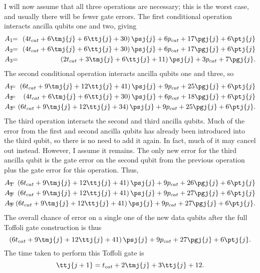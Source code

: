 I will now assume that all three operations are necessary; this is the
worst case, and usually there will be fewer gate errors.  The first
conditional operation interacts ancilla qubits one and two, giving
\begin{eqnarray}
	A_1 & \!\! = & \!\! \left(4 t_{cat} + 6 \tmj{j} + 6 \ttj{j} + 30 \right) \psj{j}
	+ 6 p_{cat} + 17 \pgj{j} + 6 \ptj{j} \\
	A_2 & \!\! = & \!\! \left(4 t_{cat} + 6 \tmj{j} + 6 \ttj{j} + 30 \right) \psj{j}
	+ 6 p_{cat} + 17 \pgj{j} + 6 \ptj{j} \\
	A_3 & \!\! = & \!\! \left(2 t_{cat} + 3 \tmj{j} + 6 \ttj{j} + 11 \right) \psj{j}
	+ 3 p_{cat} + 7 \pgj{j}.
\end{eqnarray}
The second conditional operation interacts ancilla qubits one and three, so
\begin{eqnarray}
	A_1 & \!\!\!\! = & \!\!\!\! \left(6 t_{cat} + 9 \tmj{j} + 12 \ttj{j} + 41
	\right) \psj{j} + 9 p_{cat} + 25 \pgj{j} + 6 \ptj{j} \\
	A_2 & \!\!\!\! = & \!\!\!\! \left(4 t_{cat} + 6 \tmj{j} + 6 \ttj{j} + 30
	\right) \psj{j} + 6 p_{cat} + 18 \pgj{j} + 6 \ptj{j} \\
	A_3 & \!\!\!\! = & \!\!\!\! \left(6 t_{cat} + 9 \tmj{j} + 12 \ttj{j} + 34
	\right) \psj{j} + 9 p_{cat} + 25 \pgj{j} + 6 \ptj{j}.
\end{eqnarray}
The third operation interacts the second and third ancilla qubits.  Much of
the error from the first and second ancilla qubits has already been
introduced into the third qubit, so there is no need to add it again.  In fact,
much of it may cancel out instead.  However, I assume it remains.  The
only new error for the third ancilla qubit is the gate error on the second
qubit from the previous operation plus the gate error for this operation.
Thus,
\begin{eqnarray}
	A_1 & \!\!\!\!\! = & \!\!\!\!\! \left(6 t_{cat} + 9 \tmj{j} + 12 \ttj{j} + 41
	\right) \psj{j} + 9 p_{cat} + 26 \pgj{j} + 6 \ptj{j} \\
	A_2 & \!\!\!\!\! = & \!\!\!\!\! \left(6 t_{cat} + 9 \tmj{j} + 12 \ttj{j} + 41
	\right) \psj{j} + 9 p_{cat} + 27 \pgj{j} + 6 \ptj{j} \\
	A_3 & \!\!\!\!\! = & \!\!\!\!\! \left(6 t_{cat} + 9 \tmj{j} + 12 \ttj{j} + 41
	\right) \psj{j} + 9 p_{cat} + 27 \pgj{j} + 6 \ptj{j}.
\end{eqnarray}
The overall chance of error on a single one of the new data qubits after the
full Toffoli gate construction is thus
\begin{equation}
	\left(6 t_{cat} + 9 \tmj{j} + 12 \ttj{j} + 41 \right)
	\psj{j} + 9 p_{cat} + 27 \pgj{j} + 6 \ptj{j}.
\end{equation}
The time taken to perform this Toffoli gate is
\begin{equation}
	\ttj{j+1} = t_{cat} + 2 \tmj{j} + 3 \ttj{j} + 12.
\end{equation}

